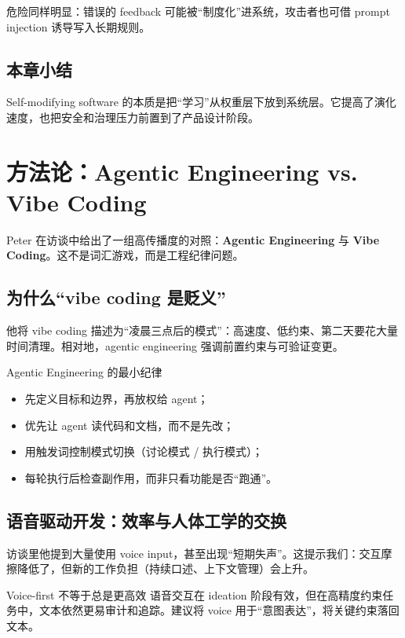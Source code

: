 \documentclass[a4paper]{article}
\begin{document}
危险同样明显：错误的 feedback 可能被“制度化”进系统，攻击者也可借 prompt injection 诱导写入长期规则。

\subsection{本章小结}
Self-modifying software 的本质是把“学习”从权重层下放到系统层。它提高了演化速度，也把安全和治理压力前置到了产品设计阶段。

\section{方法论：Agentic Engineering vs. Vibe Coding}

Peter 在访谈中给出了一组高传播度的对照：\textbf{Agentic Engineering} 与 \textbf{Vibe Coding}。这不是词汇游戏，而是工程纪律问题。

\subsection{为什么“vibe coding 是贬义”}

他将 vibe coding 描述为“凌晨三点后的模式”：高速度、低约束、第二天要花大量时间清理。相对地，agentic engineering 强调前置约束与可验证变更。

\begin{importantbox}{Agentic Engineering 的最小纪律}
\begin{itemize}
    \item 先定义目标和边界，再放权给 agent；
    \item 优先让 agent 读代码和文档，而不是先改；
    \item 用触发词控制模式切换（讨论模式 / 执行模式）；
    \item 每轮执行后检查副作用，而非只看功能是否“跑通”。
\end{itemize}
\end{importantbox}

\subsection{语音驱动开发：效率与人体工学的交换}

访谈里他提到大量使用 voice input，甚至出现“短期失声”。这提示我们：交互摩擦降低了，但新的工作负担（持续口述、上下文管理）会上升。

\begin{warningbox}{Voice-first 不等于总是更高效}
语音交互在 ideation 阶段有效，但在高精度约束任务中，文本依然更易审计和追踪。建议将 voice 用于“意图表达”，将关键约束落回文本。
\end{warningbox}
\end{document}
